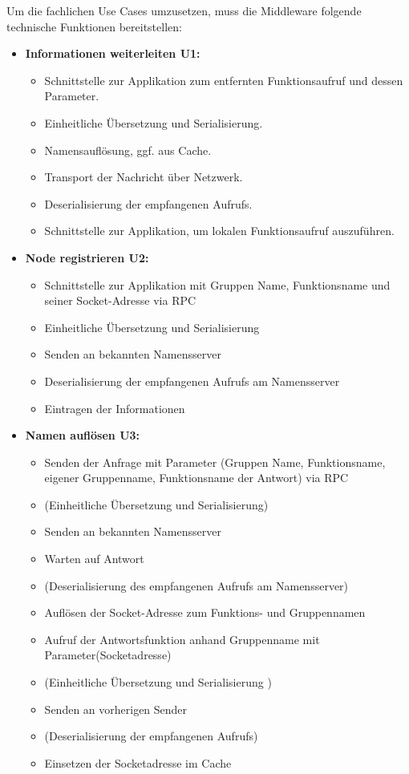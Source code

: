 Um die fachlichen Use Cases umzusetzen, muss die Middleware folgende technische Funktionen bereitstellen:

\begin{itemize}
	\item \textbf{Informationen weiterleiten U1:}\\
	\begin{itemize}
		\item Schnittstelle zur Applikation zum entfernten Funktionsaufruf und dessen Parameter.
		\item Einheitliche Übersetzung und Serialisierung. 
		\item Namensauflösung, ggf. aus Cache.
		\item Transport der Nachricht über Netzwerk. 
		\item Deserialisierung der empfangenen Aufrufs.
		\item Schnittstelle zur Applikation, um lokalen Funktionsaufruf auszuführen.  
	\end{itemize}
	
	\item \textbf{Node registrieren U2:}\\
	\begin{itemize}
		\item Schnittstelle zur Applikation mit Gruppen Name, Funktionsname und seiner Socket-Adresse via RPC
		\item Einheitliche Übersetzung und Serialisierung 
		\item Senden an bekannten Namensserver
		\item Deserialisierung der empfangenen Aufrufs am Namensserver
		\item Eintragen der Informationen
	\end{itemize}
	
	\item \textbf{Namen auflösen U3:}\\
	\begin{itemize}
		\item Senden der Anfrage mit Parameter (Gruppen Name, Funktionsname, eigener Gruppenname, Funktionsname der Antwort) via RPC
		\item (Einheitliche Übersetzung und Serialisierung)
		\item Senden an bekannten Namensserver
		\item Warten auf Antwort
		\item (Deserialisierung des empfangenen Aufrufs am Namensserver)
		\item Auflösen der Socket-Adresse zum Funktions- und Gruppennamen
		\item Aufruf der Antwortsfunktion anhand Gruppenname mit Parameter(Socketadresse)
		\item (Einheitliche Übersetzung und Serialisierung )
		\item Senden an vorherigen Sender
		\item (Deserialisierung der empfangenen Aufrufs)
		\item Einsetzen der Socketadresse im Cache
	\end{itemize}
	

\end{itemize}
